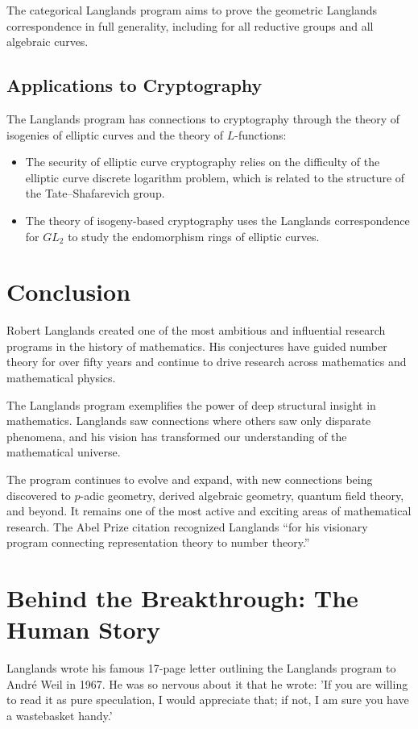 The categorical Langlands program aims to prove the geometric Langlands correspondence in full generality, including for all reductive groups and all algebraic curves.

\subsection{Applications to Cryptography}

The Langlands program has connections to cryptography through the theory of isogenies of elliptic curves and the theory of $L$-functions:
\begin{itemize}
\item The security of elliptic curve cryptography relies on the difficulty of the elliptic curve discrete logarithm problem, which is related to the structure of the Tate--Shafarevich group.
\item The theory of isogeny-based cryptography uses the Langlands correspondence for $GL_2$ to study the endomorphism rings of elliptic curves.
\end{itemize}

\section{Conclusion}

Robert Langlands created one of the most ambitious and influential research programs in the history of mathematics. His conjectures have guided number theory for over fifty years and continue to drive research across mathematics and mathematical physics.

The Langlands program exemplifies the power of deep structural insight in mathematics. Langlands saw connections where others saw only disparate phenomena, and his vision has transformed our understanding of the mathematical universe.

The program continues to evolve and expand, with new connections being discovered to $p$-adic geometry, derived algebraic geometry, quantum field theory, and beyond. It remains one of the most active and exciting areas of mathematical research. The Abel Prize citation recognized Langlands ``for his visionary program connecting representation theory to number theory.''

\section{Behind the Breakthrough: The Human Story}
Langlands wrote his famous 17-page letter outlining the Langlands program to Andr\'e Weil in 1967. He was so nervous about it that he wrote: 'If you are willing to read it as pure speculation, I would appreciate that; if not, I am sure you have a wastebasket handy.'

